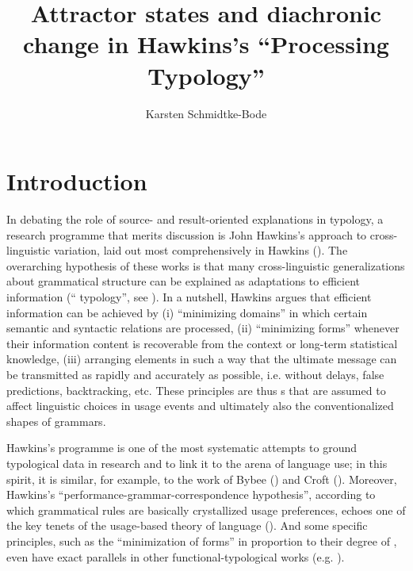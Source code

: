 \documentclass[output=paper]{langsci/langscibook}
\author{Karsten Schmidtke-Bode\affiliation{Leipzig University and Friedrich Schiller University Jena}}
\title{Attractor states and diachronic change in Hawkins’s “Processing Typology”}
\begin{document}
\maketitle 
 
\section{Introduction} 

In debating the role of source- and result-oriented explanations in typology, a research programme that merits discussion is John Hawkins’s approach to cross-linguistic variation, laid out most comprehensively in Hawkins (\citeyear{Hawkins1994_Perf,Hawkins2004_Eff,Hawkins2014_VarEff}). The overarching hypothesis of these works is that many cross-linguistic generalizations about grammatical structure can be explained as adaptations to efficient information  (“ typology”, see \citealt{Hawkins2007_Proc}). In a nutshell, Hawkins argues that efficient information  can be achieved by (i) “minimizing domains” in which certain semantic and syntactic relations are processed, (ii) “minimizing forms” whenever their information content is recoverable from the context or long-term statistical knowledge, (iii) arranging elements in such a way that the ultimate message can be transmitted as rapidly and accurately as possible, i.e. without delays, false predictions, backtracking, etc. These  principles are thus s that are assumed to affect linguistic choices in usage events and ultimately also the conventionalized shapes of grammars.

Hawkins’s programme is one of the most systematic attempts to ground typological data in  research and to link it to the arena of language use; in this spirit, it is similar, for example, to the work of Bybee (\citeyear{Bybee1985_Morph,Bybee2010_Cogn}) and Croft (\citeyear{Croft2001_RadCon,Croft2003_Typ}). Moreover, Hawkins’s “performance-grammar-correspon\-dence hypothesis”, according to which grammatical rules are basically crystallized usage preferences, echoes one of the key tenets of the usage-based theory of language (\citealt{Langacker1987_Found,Kemmer2000_Intro}). And some specific  principles, such as the “minimization of forms” in proportion to their degree of , even have exact parallels in other functional-typological works (e.g. \citealt{Haiman1983_Icon,Croft2003_Typ,Haspelmath2008_Econ}). 
\end{document}
